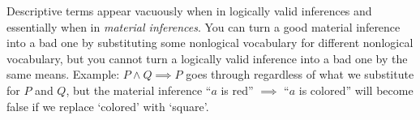 
Descriptive terms appear vacuously when in logically valid inferences and essentially when in \emph{material inferences}. You can turn a good material inference into a bad one by substituting some nonlogical vocabulary for different nonlogical vocabulary, but you cannot turn a logically valid inference into a bad one by the same means. Example: $P \land Q \implies P$ goes through regardless of what we substitute for $P$ and $Q$, but the material inference ``$a$ is red'' $\implies$ ``$a$ is colored'' will become false if we replace `colored' with `square'.

